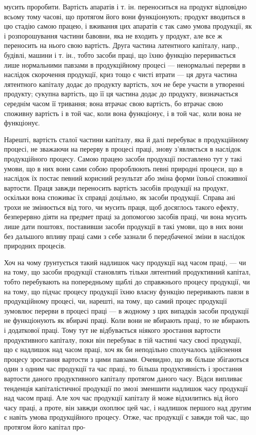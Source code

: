 мусить проробити. Вартість апаратів і т. ін. переноситься на продукт
відповідно всьому тому часові, що протягом його вони функціонують;
продукт вводиться в цю стадію самою працею, і вживання цих апаратів
є так само умова продукції, як і розпорошування частини
бавовни, яка не входить у продукт, але все ж    переносить на нього
свою вартість. Друга частина латентного капіталу, напр., будівлі, машини
і т. ін., тобто засоби праці, що їхню функцію переривається лише
нормальними павзами в продукційному процесі — ненормальні
перерви в наслідок скорочення продукції, криз тощо є чисті
втрати — ця друга частина лятентного капіталу додає до продукту
вартість, хоч не бере участи в утворенні продукту; сукупна вартість, що
її ця частина додає до продукту, визначається середнім часом її тривання;
вона втрачає свою вартість, бо втрачає свою споживну вартість і в той
час, коли вона функціонує, і в той час, коли вона не функціонує.

Нарешті, вартість сталої частини капіталу, яка й далі перебуває в
продукційному процесі, не зважаючи на перерву в процесі праці, знову
з’являється в наслідок продукційного процесу. Самою працею засоби
продукції поставлено тут у такі умови, що в них вони сами собою пророблюють
певні природні процеси, що в наслідок їх постає певний
корисний результат або зміна форми їхньої споживної вартости. Праця
завжди переносить вартість засобів продукції на продукт, оскільки вона
споживає їх справді доцільно, як засоби продукції. Справа ані трохи не
змінюється від того, чи мусить праця, щоб досяглось такого ефекту,
безперервно діяти на предмет праці за допомогою засобів праці, чи вона
мусить лише дати поштовх, поставивши засоби продукції в такі умови,
що в них вони без дальшого впливу праці сами з себе зазнали б
передбаченої зміни в наслідок природних процесів.

Хоч на чому ґрунтується такий надлишок часу продукції над часом
праці, — чи на тому, що засоби продукції становлять тільки лятентний
продуктивний капітал, тобто перебувають на попередньому щаблі до
справжнього процесу продукції, чи на тому, що підчас процесу продукції
їхню власну функцію переривають павзи в продукційному процесі, чи,
нарешті, на тому, що самий процес продукції зумовлює перерви в процесі
праці — в жодному з цих випадків засоби продукції не функціонують як
вбирачі праці. Коли вони не вбирають праці, то не вбирають і додаткової
праці. Тому тут не відбувається ніякого зростання вартости продуктивного
капіталу, поки він перебуває в тій частині часу своєї продукції, що є надлишок
над часом праці, хоч як би неподільно сполучалось здійснення процесу
зростання вартости з цими павзами. Очевидно, що як більше збігаються один
з одним час продукції та час праці, то більша продуктивність і зростання
вартости даного продуктивного капіталу протягом даного часу. Відси
випливає тенденція капіталістичної продукції по змозі зменшити надлишок
часу продукції над часом праці. Але хоч час продукції капіталу й може
відхилитись від його часу праці, а проте, він завжди охоплює цей час,
і надлишок першого над другим є навіть умова продукційного процесу.
Отже, час продукції є завжди той час, що протягом його капітал про-

